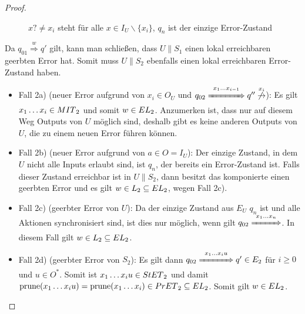 \begin{proof}
\begin{itemize}
\begin{figure} [h!tbp]
\begin{center}
        \caption{$x?\neq x_i$ steht für alle $x\in I_U\backslash\{x_i\}$, $q_n$
          ist der einzige Error-Zustand}
\label{UmitE}
      \end{center}
      \end{figure}
      Da $q_{01} \overset{w}{\Rightarrow} q'$ gilt, kann man schließen, dass $U\|S_1$
      einen lokal erreichbaren geerbten Error hat. Somit muss $U\|S_2$ ebenfalls einen
      lokal erreichbaren Error-Zustand haben.
      \begin{itemize}
        \item Fall 2a) (neuer Error aufgrund von $x_i\in O_U$ und $q_{02}
          \overset{x_1\dots x_{i-1}}{\xRightarrow{\hspace{1.3cm}}} q''
          \overset{x_i}{\not{\hspace{-0.1cm}\rightarrow}}$): Es gilt $x_1\dots
          x_i\in MIT{}_2$ und somit $w\in EL{}_2$. Anzumerken ist, dass nur
          auf diesem Weg Outputs von $U$ möglich sind, deshalb gibt es keine
          anderen Outputs von $U$, die zu einem neuen Error führen können.
        \item Fall 2b) (neuer Error aufgrund von $a\in O = I_U$): Der einzige
          Zustand, in dem $U$ nicht alle Inputs erlaubt sind, ist $q_n$, der
          bereits ein Error-Zustand ist. Falls dieser Zustand erreichbar ist in
          $U\|S_2$, dann besitzt das komponierte \EIO{} einen geerbten Error und
          es gilt $w\in L_2\subseteq EL{}_2$, wegen Fall 2c).
        \item Fall 2c) (geerbter Error von $U$): Da der einzige Zustand aus
          $E_U$ $q_n$ ist und alle Aktionen synchronisiert sind, ist dies nur
          möglich, wenn gilt $q_{02} \overset{x_1\dots
          x_n}{\xRightarrow{\hspace{1cm}}}$. In
          diesem Fall gilt $w\in L_2\subseteq EL{}_2$.
        \item Fall 2d) (geerbter Error von $S_2$): Es gilt dann $q_{02}
          \overset{x_1\dots x_iu}{\xRightarrow{\hspace{1.2cm}}} q'\in E_2$ für $i\geq 0$ und
          $u\in O^*$. Somit ist $x_1\dots x_iu\in StET{}_2$ und damit
          $\mathrm{prune}{}(x_1\dots x_iu)=\mathrm{prune}{}(x_1\dots x_i)\in PrET{}_2\subseteq
          EL{}_2$. Somit gilt $w\in EL{}_2$.
      \end{itemize}
  \end{itemize}
\end{proof}

